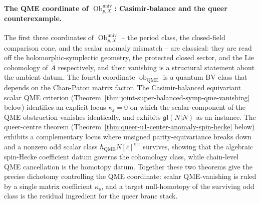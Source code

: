 \paragraph*{The QME coordinate of \(\operatorname{Ob}^{\mathrm{univ}}_{p,X}\): Casimir-balance and the queer counterexample.}
The first three coordinates of
\(\operatorname{Ob}^{\mathrm{univ}}_{p,X}\) -- the period class, the
closed-field comparison cone, and the scalar anomaly mismatch -- are
classical: they are read off the holomorphic-symplectic geometry,
the protected closed sector, and the Lie cohomology of \(\bar A\)
respectively, and their vanishing is a structural statement about
the ambient datum.  The fourth coordinate
\(\operatorname{ob}_{\mathrm{QME}}\) is a quantum BV class that
depends on the Chan-Paton matrix factor.  The Casimir-balanced
equivariant scalar QME criterion
(Theorem~\ref{thm:joint-super-balanced-symp-qme-vanishing} below)
identifies an explicit locus
\(\kappa_{\mathfrak s}=0\) on which the scalar component of the
QME obstruction vanishes identically, and exhibits
\(\mathfrak{gl}(N|N)\) as an instance.  The queer-centre theorem
(Theorem~\ref{thm:queer-u1-center-anomaly-spin-hecke} below)
exhibits a complementary locus where unsigned parity-equivariance
breaks down and a nonzero odd scalar class
\(\hbar_{\mathrm{QME}} N[\bar c]^{\mathrm{otr}}\) survives, showing that the
algebraic spin-Hecke coefficient datum governs the cohomology class,
while chain-level QME cancellation is the homotopy datum.
Together these two theorems give the precise dichotomy controlling
the QME coordinate: scalar QME-vanishing is ruled by a single matrix
coefficient \(\kappa_{\mathfrak s}\), and a target null-homotopy of
the surviving odd class is the residual ingredient for the queer
brane stack.

